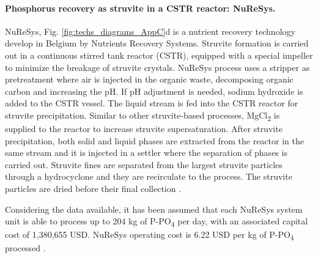 \begin{refsection}[referencesCh4]
\begin{table}[h] 
		\centering
		\caption{Sizing and equipment cost estimated for Ostara Pearl process} \label{table:ostara_costs}
\end{table}

\paragraph{Phosphorus recovery as struvite in a CSTR reactor: \newline NuReSys.}
NuReSys, Fig. \ref{fig:techs_diagrams_AppC}d is a nutrient recovery technology develop in Belgium by Nutrients Recovery Systems. Struvite formation is carried out in a continuous stirred tank reactor (CSTR), equipped with a special impeller to minimize the breakage of struvite crystals. NuReSys process uses a stripper as pretreatment where air is injected in the organic waste, decomposing organic carbon and increasing the pH. If pH adjustment is needed, sodium hydroxide is added to the CSTR vessel. The liquid stream is fed into the CSTR reactor for struvite precipitation. Similar to other struvite-based processes, MgCl\textsubscript{2} is supplied to the reactor to increase struvite supersaturation. After struvite precipitation, both solid and liquid phases are extracted from the reactor in the same stream and it is injected in a settler where the separation of phases is carried out. Struvite fines are separated from the largest struvite particles through a hydrocyclone and they are recirculate to the process. The struvite particles are dried before their final collection \citep{Pearl2Kcost2}.

Considering the data available, it has been assumed that each NuReSys system unit is able to process up to 204 kg of P-PO\textsubscript{4} per day, with an associated capital cost of 1,380,655 USD. NuReSys operating cost is 6.22 USD per kg of P-PO\textsubscript{4} processed \citep{Pearl2Kcost2}.


\end{refsection}

